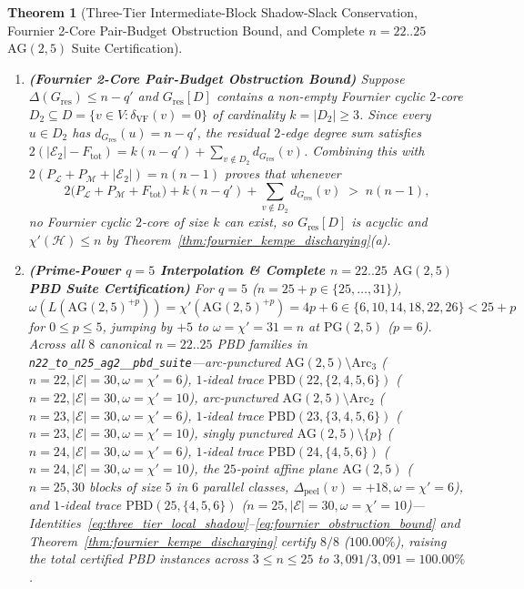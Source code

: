 \documentclass[11pt,reqno]{amsart}
\newtheorem{theorem}{Theorem}[section]
\theoremstyle{definition}
\theoremstyle{remark}
\begin{document}
\begin{theorem}[Three-Tier Intermediate-Block Shadow-Slack Conservation, Fournier 2-Core Pair-Budget Obstruction Bound, and Complete $n = 22..25$ $\mathrm{AG}(2,5)$ Suite Certification]
\begin{enumerate}
\begin{equation}
\begin{aligned}
    \end{aligned}
  \end{equation}
  \item[\textup{(b)}] \textbf{(Fournier 2-Core Pair-Budget Obstruction Bound)} Suppose $\Delta(G_{\mathrm{res}}) \le n - q'$ and $G_{\mathrm{res}}[D]$ contains a non-empty Fournier cyclic $2$-core $D_2 \subseteq D = \{v \in V : \delta_{\mathrm{VF}}(v) = 0\}$ of cardinality $k = |D_2| \ge 3$. Since every $u \in D_2$ has $d_{G_{\mathrm{res}}}(u) = n - q'$, the residual $2$-edge degree sum satisfies $2(|\mathcal{E}_2| - F_{\mathrm{tot}}) = k(n - q') + \sum_{v \notin D_2} d_{G_{\mathrm{res}}}(v)$. Combining this with $2(P_{\mathcal{L}} + P_{\mathcal{M}} + |\mathcal{E}_2|) = n(n - 1)$ proves that whenever
  \begin{equation}\label{eq:fournier_obstruction_bound}
    2\bigl(P_{\mathcal{L}} + P_{\mathcal{M}} + F_{\mathrm{tot}}\bigr) + k(n - q') + \sum_{v \notin D_2} d_{G_{\mathrm{res}}}(v) \;>\; n(n - 1),
  \end{equation}
  no Fournier cyclic $2$-core of size $k$ can exist, so $G_{\mathrm{res}}[D]$ is acyclic and $\chi'(\mathcal{H}) \le n$ by Theorem~\ref{thm:fournier_kempe_discharging}(a).
  \item[\textup{(c)}] \textbf{(Prime-Power $q = 5$ Interpolation \& Complete $n = 22..25$ $\mathrm{AG}(2,5)$ PBD Suite Certification)} For $q = 5$ ($n = 25 + p \in \{25, \dots, 31\}$), $\omega(L(\mathrm{AG}(2,5)^{+p})) = \chi'(\mathrm{AG}(2,5)^{+p}) = 4p + 6 \in \{6, 10, 14, 18, 22, 26\} < 25 + p$ for $0 \le p \le 5$, jumping by $+5$ to $\omega = \chi' = 31 = n$ at $\mathrm{PG}(2,5)$ ($p = 6$). Across all $8$ canonical $n = 22..25$ PBD families in \texttt{n22\_\allowbreak to\_\allowbreak n25\_\allowbreak ag2\_\_\allowbreak pbd\_\allowbreak suite}---arc-punctured $\mathrm{AG}(2,5)\setminus\mathrm{Arc}_3$ ($n = 22, |\mathcal{E}| = 30, \omega = \chi' = 6$), $1$-ideal trace $\mathrm{PBD}(22,\{2,4,5,6\})$ ($n = 22, |\mathcal{E}| = 30, \omega = \chi' = 10$), arc-punctured $\mathrm{AG}(2,5)\setminus\mathrm{Arc}_2$ ($n = 23, |\mathcal{E}| = 30, \omega = \chi' = 6$), $1$-ideal trace $\mathrm{PBD}(23,\{3,4,5,6\})$ ($n = 23, |\mathcal{E}| = 30, \omega = \chi' = 10$), singly punctured $\mathrm{AG}(2,5)\setminus\{p\}$ ($n = 24, |\mathcal{E}| = 30, \omega = \chi' = 6$), $1$-ideal trace $\mathrm{PBD}(24,\{4,5,6\})$ ($n = 24, |\mathcal{E}| = 30, \omega = \chi' = 10$), the $25$-point affine plane $\mathrm{AG}(2,5)$ ($n = 25, 30$ blocks of size $5$ in $6$ parallel classes, $\Delta_{\mathrm{peel}}(v) = +18, \omega = \chi' = 6$), and $1$-ideal trace $\mathrm{PBD}(25,\{4,5,6\})$ ($n = 25, |\mathcal{E}| = 30, \omega = \chi' = 10$)---Identities~\eqref{eq:three_tier_local_shadow}--\eqref{eq:fournier_obstruction_bound} and Theorem~\ref{thm:fournier_kempe_discharging} certify $8 / 8$ ($100.00\%$), raising the total certified PBD instances across $3 \le n \le 25$ to $3{,}091 / 3{,}091 = 100.00\%$.
\end{enumerate}
\end{theorem}
\end{document}
